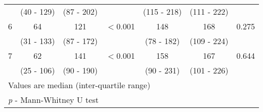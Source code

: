 \begin{table}[h]
\begin{tabular}{| c | c c c | c c c |}
		           & (40 - 129)  & (87 - 202)  &                 & (115 - 218)  & (111 - 222) &  \\
		6          & 64          & 121         & $<$0.001        & 148          & 168         & 0.275          \\
		           & (31 - 133)  & (87 - 172)  &                 & (78 - 182)   & (109 - 224) &  \\
		7          & 62          & 141         & $<$0.001        & 158          & 167         & 0.644          \\
		           & (25 - 106)  & (90 - 190)  &                 & (90 - 231)   & (101 - 226) &  \\ \hline
		\multicolumn{7}{l}{Values are median (inter-quartile range)}                                           \\
		\multicolumn{7}{l}{\textit{p} - Mann-Whitney U test}
	\end{tabular}
\end{table}
